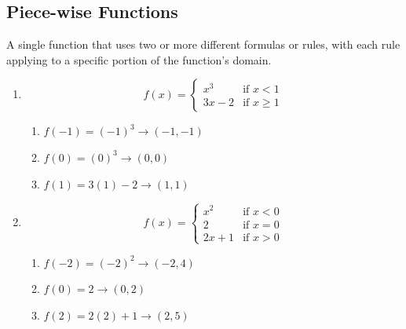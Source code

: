 \subsection{Piece-wise Functions}
\begin{definition}
  A single function that uses two or more different formulas or rules, with each rule applying to a specific portion of the function's domain.
\end{definition}

\begin{example}[Algebraic]
  \hfill
  \begin{enumerate}
  \item $$f(x) = \begin{cases}
    x^3 & \text{if } x < 1 \\
    3x - 2 & \text{if } x \ge 1
  \end{cases}$$
    \begin{enumerate}
    \item $f(-1) = (-1)^3 \to (-1, -1)$
    \item $f(0) = (0)^3 \to (0, 0)$
    \item $f(1) = 3(1) - 2 \to (1, 1)$
    \end{enumerate}
  \item $$f(x) = \begin{cases}
    x^2 & \text{if } x < 0 \\
    2 & \text{if } x = 0 \\
    2x + 1 & \text{if } x > 0
  \end{cases}$$
    \begin{enumerate}
    \item $f(-2) = (-2)^2 \to (-2, 4)$
    \item $f(0) = 2 \to (0, 2)$
    \item $f(2) = 2(2) + 1 \to (2, 5)$
    \end{enumerate}
  \end{enumerate}
\end{example}

